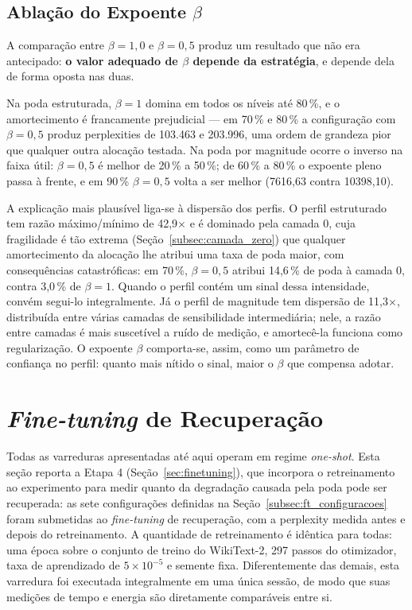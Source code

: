 \subsection{Ablação do Expoente $\beta$}\label{subsec:ablacao_beta}

A comparação entre $\beta = 1{,}0$ e $\beta = 0{,}5$ produz um resultado que
não era antecipado: \textbf{o valor adequado de $\beta$ depende da
estratégia}, e depende dela de forma oposta nas duas.

Na poda estruturada, $\beta = 1$ domina em todos os níveis até 80\,\%, e o
amortecimento é francamente prejudicial --- em 70\,\% e 80\,\% a configuração
com $\beta = 0{,}5$ produz perplexities de 103.463 e 203.996, uma ordem de
grandeza pior que qualquer outra alocação testada. Na poda por magnitude ocorre
o inverso na faixa útil: $\beta = 0{,}5$ é melhor de 20\,\% a 50\,\%; de 60\,\% a 80\,\%
o expoente pleno passa à frente, e em 90\,\% $\beta = 0{,}5$ volta a ser melhor
(7616,63 contra 10398,10).

A explicação mais plausível liga-se à dispersão dos perfis. O perfil
estruturado tem razão máximo/mínimo de 42,9$\times$ e é dominado pela camada 0,
cuja fragilidade é tão extrema (Seção~\ref{subsec:camada_zero}) que qualquer
amortecimento da alocação lhe atribui uma taxa de poda maior, com consequências
catastróficas: em 70\,\%, $\beta = 0{,}5$ atribui 14,6\,\% de poda à camada 0,
contra 3,0\,\% de $\beta = 1$. Quando o perfil contém um sinal dessa
intensidade, convém segui-lo integralmente. Já o perfil de magnitude tem
dispersão de 11,3$\times$, distribuída entre várias camadas de sensibilidade
intermediária; nele, a razão entre camadas é mais suscetível a ruído de
medição, e amortecê-la funciona como regularização. O expoente $\beta$
comporta-se, assim, como um parâmetro de confiança no perfil: quanto mais
nítido o sinal, maior o $\beta$ que compensa adotar.

\section{\textit{Fine-tuning} de Recuperação}\label{sec:res_finetune}

Todas as varreduras apresentadas até aqui operam em regime \textit{one-shot}.
Esta seção reporta a Etapa 4 (Seção~\ref{sec:finetuning}), que incorpora o
retreinamento ao experimento para medir quanto da degradação causada pela poda
pode ser recuperada: as sete configurações definidas na
Seção~\ref{subsec:ft_configuracoes} foram submetidas ao
\textit{fine-tuning} de recuperação, com a perplexity medida antes e depois do
retreinamento.
A quantidade de retreinamento é
idêntica para todas: uma época sobre o conjunto de treino do WikiText-2, 297
passos do otimizador, taxa de aprendizado de $5 \times 10^{-5}$ e semente
fixa. Diferentemente das demais, esta varredura foi executada integralmente
em uma única sessão, de modo que suas medições de tempo e energia são
diretamente comparáveis entre si.

